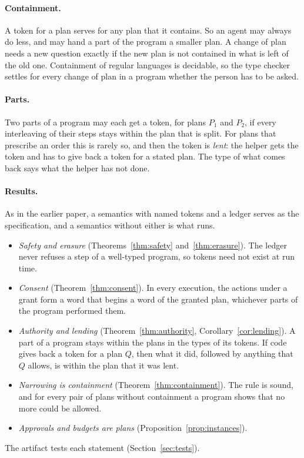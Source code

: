 \documentclass[acmsmall,nonacm,screen]{acmart}
\begin{document}
\paragraph{Containment.} A token for a plan serves for any plan that it contains. So an
agent may always do less, and may hand a part of the program a smaller plan. A change of
plan needs a new question exactly if the new plan is not contained in what is left of the
old one. Containment of regular languages is decidable, so the type checker settles for
every change of plan in a program whether the person has to be asked.

\paragraph{Parts.} Two parts of a program may each get a token, for plans $P_1$ and $P_2$,
if every interleaving of their steps stays within the plan that is split. For plans that
prescribe an order this is rarely so, and then the token is \emph{lent}: the helper gets the
token and has to give back a token for a stated plan. The type of what comes back says what
the helper has not done.

\paragraph{Results.} As in the earlier paper, a semantics with named tokens and a ledger
serves as the specification, and a semantics without either is what runs.
\begin{itemize}
\item \emph{Safety and erasure} (Theorems~\ref{thm:safety} and~\ref{thm:erasure}). The
  ledger never refuses a step of a well-typed program, so tokens need not exist at run time.
\item \emph{Consent} (Theorem~\ref{thm:consent}). In every execution, the actions under a
  grant form a word that begins a word of the granted plan, whichever parts of the program
  performed them.
\item \emph{Authority and lending} (Theorem~\ref{thm:authority},
  Corollary~\ref{cor:lending}). A part of a program stays within the plans in the types of
  its tokens. If code gives back a token for a plan $Q$, then what it did, followed by
  anything that $Q$ allows, is within the plan that it was lent.
\item \emph{Narrowing is containment} (Theorem~\ref{thm:containment}). The rule is sound,
  and for every pair of plans without containment a program shows that no more could be
  allowed.
\item \emph{Approvals and budgets are plans} (Proposition~\ref{prop:instances}).
\end{itemize}
The artifact tests each statement (Section~\ref{sec:tests}).
\end{document}
